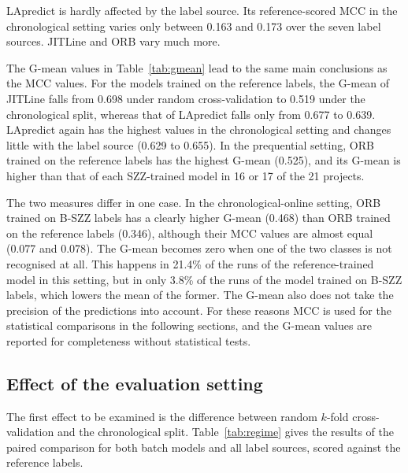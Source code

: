\documentclass[12pt,a4paper,oneside]{report}
\begin{document}
LApredict is hardly affected by the label source. Its reference-scored MCC in
the chronological setting varies only between 0.163 and 0.173 over the seven
label sources. JITLine and ORB vary much more.

The G-mean values in Table~\ref{tab:gmean} lead to the same main conclusions
as the MCC values. For the models trained on the reference labels, the G-mean
of JITLine falls from 0.698 under random cross-validation to 0.519 under the
chronological split, whereas that of LApredict falls only from 0.677 to 0.639.
LApredict again has the highest values in the chronological setting and
changes little with the label source (0.629 to 0.655). In the prequential
setting, ORB trained on the reference labels has the highest G-mean (0.525),
and its G-mean is higher than that of each SZZ-trained model in 16 or 17 of
the 21 projects.

The two measures differ in one case. In the chronological-online setting, ORB
trained on B-SZZ labels has a clearly higher G-mean (0.468) than ORB trained
on the reference labels (0.346), although their MCC values are almost equal
(0.077 and 0.078). The G-mean becomes zero when one of the two classes is not
recognised at all. This happens in 21.4\% of the runs of the reference-trained
model in this setting, but in only 3.8\% of the runs of the model trained on
B-SZZ labels, which lowers the mean of the former. The G-mean also does not
take the precision of the predictions into account. For these reasons MCC is
used for the statistical comparisons in the following sections, and the
G-mean values are reported for completeness without statistical tests.

\subsection{Effect of the evaluation setting}

The first effect to be examined is the difference between random $k$-fold
cross-validation and the chronological split. Table~\ref{tab:regime} gives
the results of the paired comparison for both batch models and all label
sources, scored against the reference labels.
\end{document}
